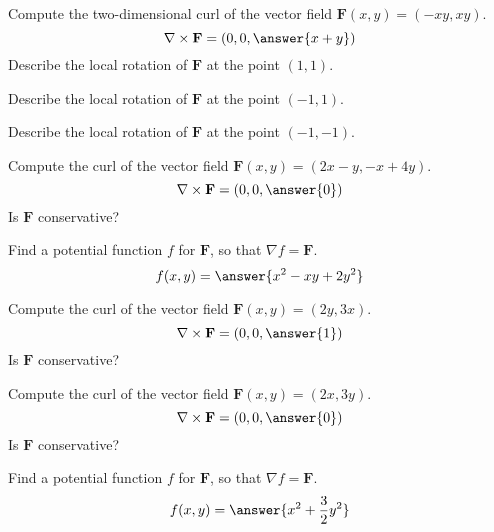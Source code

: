 \documentclass{ximera}
\begin{document}
\begin{problem}
Compute the two-dimensional curl of the vector field $\mathbf{F}(x,y) = (-xy, xy)$.
\[
\nabla\times \mathbf{F} = \left(0,0,\answer{x+y}\right)
\]
Describe the local rotation of $\mathbf{F}$ at the point $(1,1)$.
\begin{multipleChoice}
\end{multipleChoice}
Describe the local rotation of $\mathbf{F}$ at the point $(-1,1)$.
\begin{multipleChoice}
\end{multipleChoice}
Describe the local rotation of $\mathbf{F}$ at the point $(-1,-1)$.
\begin{multipleChoice}
\end{multipleChoice}
\end{problem}

\begin{problem}
Compute the curl of the vector field $\mathbf{F}(x,y) = (2x-y, -x+4y)$.
\[
\nabla\times\mathbf{F} = (0,0,\answer{0})
\]
Is $\mathbf{F}$ conservative?
\begin{multipleChoice}
\end{multipleChoice}
\begin{problem}
Find a potential function $f$ for $\mathbf{F}$, so that $\nabla f = \mathbf{F}$.
\[
f(x,y) = \answer{x^2-xy+2y^2}
\]
\end{problem}
\end{problem}

\begin{problem}
Compute the curl of the vector field $\mathbf{F}(x,y) = (2y, 3x)$.
\[
\nabla\times\mathbf{F} = (0,0,\answer{1})
\]
Is $\mathbf{F}$ conservative?
\begin{multipleChoice}
\end{multipleChoice}
\end{problem}

\begin{problem}
Compute the curl of the vector field $\mathbf{F}(x,y) = (2x, 3y)$.
\[
\nabla\times\mathbf{F} = (0,0,\answer{0})
\]
Is $\mathbf{F}$ conservative?
\begin{multipleChoice}
\end{multipleChoice}
\begin{problem}
Find a potential function $f$ for $\mathbf{F}$, so that $\nabla f = \mathbf{F}$.
\[
f(x,y) = \answer{x^2+\frac{3}{2}y^2}
\]
\end{problem}
\end{problem}
\end{document}

